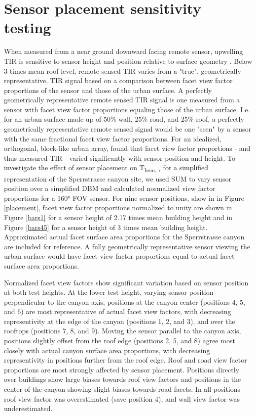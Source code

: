 \section{Sensor placement sensitivity testing} \label{Methodological limitations and considerations}

 When measured from a near ground downward facing remote sensor, upwelling TIR is sensitive to sensor height and position relative to surface geometry \citep{Adderley2015, Roberts2010}. Below 3 times mean roof level, remote sensed TIR varies from a "true", geometrically representative, TIR signal based on a comparison between facet view factor proportions of the sensor and those of the urban surface. A perfectly geometrically representative remote sensed TIR signal is one measured from a sensor with facet view factor proportions equaling those of the urban surface. I.e. for an urban surface made up of 50\% wall, 25\% road, and 25\% roof, a perfectly geometrically representative remote sensed signal would be one "seen" by a sensor with the same fractional facet view factor proportions. For an idealized, orthogonal, block-like urban array, \citet{Roberts2010} found that facet view factor proportions - and thus measured TIR - varied significantly with sensor position and height. To investigate the effect of sensor placement on T\textsubscript{hem, r} for a simplified representation of the Sperrstrasse canyon site, we used SUM to vary sensor position over a simplified DBM and calculated normalized view factor proportions for a 160\si{\degree} FOV sensor. For nine sensor positions, show in in Figure \ref{placement}, facet view factor proportions normalized to unity are shown in Figure \ref{bars1} for a sensor height of 2.17 times mean building height and in Figure \ref{bars45} for a sensor height of 3 times mean building height. Approximated actual facet surface area proportions for the Sperrstrasse canyon are included for reference. A fully geometrically representative sensor viewing the urban surface would have facet view factor proportions equal to actual facet surface area proportions. 
  
 Normalized facet view factors show significant variation based on sensor position at both test heights. At the lower test height, varying sensor position perpendicular to the canyon axis, positions at the canyon center (positions 4, 5, and 6) are most representative of actual facet view factors, with decreasing representivity at the edge of the canyon (positions 1, 2, and 3), and over the rooftops (positions 7, 8, and 9). Moving the sensor parallel to the canyon axis, positions slightly offset from the roof edge (positions 2, 5, and 8) agree most closely with actual canyon surface area proportions, with decreasing representivity in positions further from the roof edge. Roof and road view factor proportions are most strongly affected by sensor placement. Positions directly over buildings show large biases towards roof view factors and positions in the center of the canyon showing slight biases towards road facets. In all positions roof view factor was overestimated (save position 4), and wall view factor was underestimated.
 
